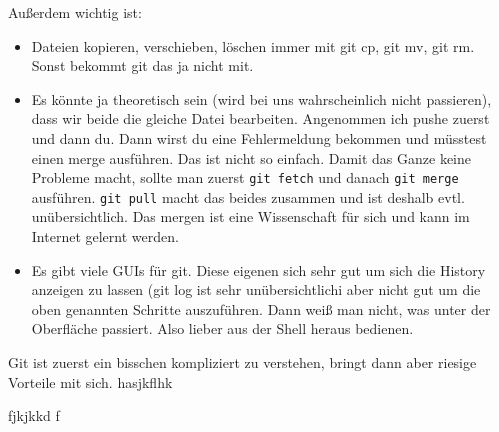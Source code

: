 \documentclass[a4paper,ngerman]{scrartcl} %
\begin{document}
Außerdem wichtig ist:
\begin{itemize}
\item Dateien kopieren, verschieben, löschen immer mit git cp, git mv, git rm. Sonst bekommt git das ja nicht mit.
\item Es könnte ja theoretisch sein (wird bei uns wahrscheinlich nicht passieren), dass wir beide die gleiche Datei bearbeiten. Angenommen ich pushe zuerst und dann du. Dann wirst du eine Fehlermeldung bekommen und müsstest einen merge ausführen. Das ist nicht so einfach. Damit das Ganze keine Probleme macht, sollte man zuerst \verb|git fetch| und danach \verb|git merge| ausführen. \verb|git pull| macht das beides zusammen und ist deshalb evtl. unübersichtlich. Das mergen ist eine Wissenschaft für sich und kann im Internet gelernt werden.
\item Es gibt viele GUIs für git. Diese eigenen sich sehr gut um sich die History anzeigen zu lassen (git log ist sehr unübersichtlich^^) aber nicht gut um die oben genannten Schritte auszuführen. Dann weiß man nicht, was unter der Oberfläche passiert. Also lieber aus der Shell heraus bedienen.
\end{itemize}

Git ist zuerst ein bisschen kompliziert zu verstehen, bringt dann aber riesige Vorteile mit sich.
hasjkflhk


fjkjkkd
f
\end{document}
